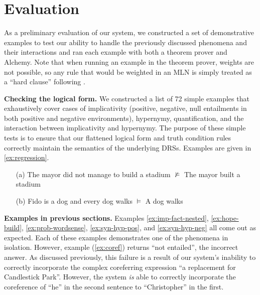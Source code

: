 \section{Evaluation}

As a preliminary evaluation of our system, we constructed a set of demonstrative
examples to test our ability to handle the previously discussed phenomena and
their interactions and ran each example with both a theorem prover and Alchemy. 
Note that when running an example in the theorem prover, weights are not
possible, so any rule that would be weighted in an MLN is simply treated as a
``hard clause'' following \citet{bos:emnlp2005}.

\noindent\textbf{Checking the logical form.}
We constructed a list of 72 simple examples  
that exhaustively cover cases of implicativity (positive, negative, null entailments
in both positive and negative environments), hypernymy,
quantification, and the interaction between implicativity and 
hypernymy.  The purpose of these simple tests is to ensure that our flattened
logical form and truth condition rules correctly maintain the semantics of the
underlying DRSs. Examples are given in \eqref{ex:regression}.

\begin{example}\label{ex:regression}
\begin{itemize}
  \item[(a)] The mayor did not manage to build a stadium $\nvDash$ The mayor built a stadium
  \item[(b)] Fido is a dog and every dog walks $\vDash$ A dog walks
\end{itemize}
\end{example}


\noindent\textbf{Examples in previous sections.}
Examples 
\eqref{ex:imp-fact-nested}, 
\eqref{ex:hope-build}, 
\eqref{ex:prob-wordsense}, 
\eqref{ex:syn-hyp-pos}, and
\eqref{ex:syn-hyp-neg} 
all come out as expected.  Each of these examples demonstrates one of the
phenomena in isolation. However, example (\ref{ex:coref}) returns ``not entailed'',
the incorrect answer.  As discussed previously, this failure is a result of our
system's inability to correctly incorporate the complex coreferring expression
``a replacement for Candlestick Park''.  However, the system {\it is} able to
correctly incorporate the coreference of ``he'' in the second sentence to
``Christopher'' in the first.

